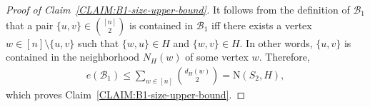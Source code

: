 \documentclass[10pt,a4paper]{amsart}
\newcommand{\graph}{H}
\begin{document}
    \begin{proof}[Proof of Claim~\ref{CLAIM:B1-size-upper-bound}]
        It follows from the definition of $\mathcal{B}_{1}$ that a pair $\{u,v\} \in \binom{[n]}{2}$ is contained in $\mathcal{B}_{1}$ iff there exists a vertex $w \in [n] \setminus \{u,v\}$ such that $\{w,u\} \in \graph$ and $\{w,v\} \in \graph$. In other words, $\{u,v\}$ is contained in the neighborhood $N_{\graph}(w)$ of some vertex $w$. 
        Therefore, 
        \begin{align*}
            e(\mathcal{B}_{1})
            \le \sum_{w\in [n]} \binom{d_{\graph}(w)}{2}
            = \mathrm{N}(S_2, \graph),
        \end{align*}
        which proves Claim~\ref{CLAIM:B1-size-upper-bound}. 
    \end{proof}%
\end{document}
